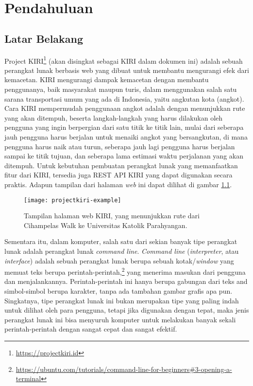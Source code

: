\chapter{Pendahuluan}
\label{chap:intro}
   
\section{Latar Belakang}
\label{sec:label}
Project KIRI\footnote{\href{https://projectkiri.id}{https://projectkiri.id}} (akan disingkat sebagai KIRI dalam dokumen ini) adalah sebuah perangkat lunak berbasis web yang dibuat untuk \mbox{membantu} mengurangi efek dari kemacetan. KIRI mengurangi dampak kemacetan dengan membantu penggunanya, baik \mbox{masyarakat} maupun turis, dalam menggunakan salah satu sarana transportasi umum yang ada di Indonesia, yaitu angkutan kota (angkot). Cara KIRI \mbox{mempermudah} penggunaan angkot adalah dengan menunjukkan rute yang akan ditempuh, beserta langkah-langkah yang harus dilakukan oleh pengguna yang ingin berpergian dari satu titik ke titik lain, mulai dari seberapa jauh pengguna harus berjalan untuk menaiki angkot yang bersangkutan, di mana pengguna harus naik atau turun, seberapa jauh lagi pengguna harus berjalan sampai ke titik tujuan, dan seberapa lama estimasi waktu perjalanan yang akan ditempuh. Untuk kebutuhan pembuatan perangkat lunak yang memanfaatkan fitur dari KIRI, tersedia juga REST API KIRI yang dapat digunakan secara praktis. Adapun tampilan dari halaman \textit{web} ini dapat dilihat di gambar \ref{fig:kiri-page}. 

\begin{figure}[ht]
    \centering
    \texttt{[image: projectkiri-example]}
    \caption[Tampilan halaman web KIRI]{Tampilan halaman web KIRI, yang menunjukkan rute dari Cihampelas Walk ke Universitas Katolik Parahyangan.}
    \label{fig:kiri-page}
\end{figure}

Sementara itu, dalam komputer, salah satu dari sekian banyak tipe perangkat lunak adalah perangkat lunak \textit{command line}. \textit{\mbox{Command} line} (\cl \textit{interpreter}, atau \cl \textit{interface}) adalah sebuah perangkat lunak berupa sebuah kotak/\textit{window} yang memuat teks berupa perintah-perintah,\footnote{\href{https://ubuntu.com/tutorials/command-line-for-beginners\#3-opening-a-terminal}{https://ubuntu.com/tutorials/command-line-for-beginners\#3-opening-a-terminal}} yang menerima masukan dari pengguna dan  menjalankannya.\cite{marsh:2010:fatfreeintrotocommandline} Perintah-perintah ini hanya berupa gabungan dari teks and simbol-simbol berupa karakter, tanpa ada tambahan gambar grafis apa pun. Singkatnya, tipe perangkat lunak ini bukan merupakan tipe yang paling indah untuk dilihat oleh para pengguna, tetapi jika digunakan dengan tepat, maka \mbox{jenis} \mbox{perangkat} lunak ini bisa menyuruh komputer untuk melakukan banyak sekali perintah-perintah dengan sangat cepat dan sangat efektif.

